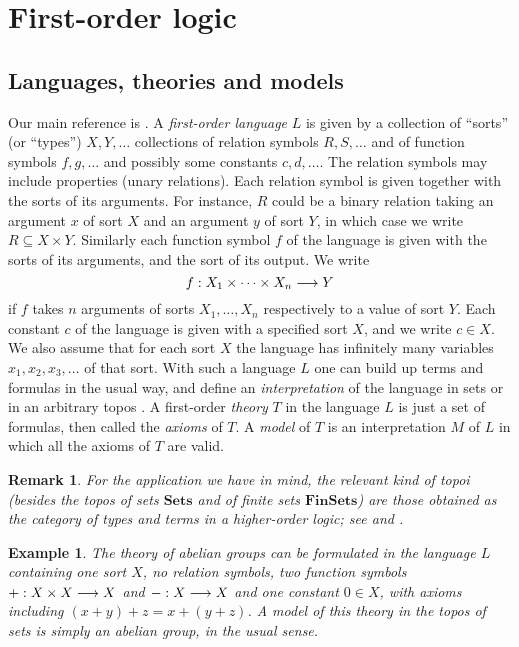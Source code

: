 \documentclass[english,letter paper,12pt,reqno]{article}
\theoremstyle{example}
\newtheorem{example}[theorem]{Example}
\newtheorem{remark}[theorem]{Remark}
\begin{document}
\section{First-order logic}

\subsection{Languages, theories and models}

Our main reference is \cite[\S X.1]{topos}. A \emph{first-order language} $L$ is given by a collection of ``sorts'' (or ``types'') $X,Y,\ldots$ collections of relation symbols $R,S,\ldots$ and of function symbols $f,g,\ldots$ and possibly some constants $c,d,\ldots$. The relation symbols may include properties (unary relations). Each relation symbol is given together with the sorts of its arguments. For instance, $R$ could be a binary relation taking an argument $x$ of sort $X$ and an argument $y$ of sort $Y$, in which case we write $R \subseteq X \times Y$. Similarly each function symbol $f$ of the language is given with the sorts of its arguments, and the sort of its output. We write
\[
f: X_1 \times \cdots \times X_n \longrightarrow Y
\]
if $f$ takes $n$ arguments of sorts $X_1,\ldots,X_n$ respectively to a value of sort $Y$. Each constant $c$ of the language is given with a specified sort $X$, and we write $c \in X$. We also assume that for each sort $X$ the language has infinitely many variables $x_1,x_2,x_3,\ldots$ of that sort. With such a language $L$ one can build up terms and formulas in the usual way, and define an \emph{interpretation} of the language in sets or in an arbitrary topos \cite[\S X.2]{topos}. A first-order \emph{theory} $T$ in the language $L$ is just a set of formulas, then called the \emph{axioms} of $T$. A \emph{model} of $T$ is an interpretation $M$ of $L$ in which all the axioms of $T$ are valid.

\begin{remark} For the application we have in mind, the relevant kind of topoi (besides the topos of sets $\textbf{Sets}$ and of finite sets $\textbf{FinSets}$) are those obtained as the category of types and terms in a higher-order logic; see \cite[\S II.1]{lambekscott} and \cite[Lecture 9]{risingseminar}.
\end{remark}

\begin{example}
The theory of \emph{abelian groups} can be formulated in the language $L$ containing one sort $X$, no relation symbols, two function symbols $+: X \times X \longrightarrow X$ and $-: X \longrightarrow X$ and one constant $0 \in X$, with axioms including $(x+y)+z = x+(y+z)$. A model of this theory in the topos of sets is simply an abelian group, in the usual sense.
\end{example}
\end{document}
